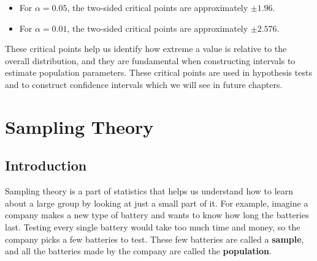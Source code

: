 \documentclass[twoside]{book}
\begin{document}
\begin{center}
\end{center}

\begin{itemize}
	\item For \(\alpha = 0.05\), the two-sided critical points are approximately \(\pm 1.96\).
	\item For \(\alpha = 0.01\), the two-sided critical points are approximately \(\pm 2.576\).
\end{itemize}

These critical points help us identify how extreme a value is relative to the overall distribution, and they are fundamental when constructing intervals to estimate population parameters. These critical points are used in hypothesis tests and to construct confidence intervals which we will see in future chapters.

\chapter{Sampling Theory}
\section{Introduction}
Sampling theory is a part of statistics that helps us understand how to learn about a large group by looking at just a small part of it. For example, imagine a company makes a new type of battery and wants to know how long the batteries last. Testing every single battery would take too much time and money, so the company picks a few batteries to test. These few batteries are called a \textbf{sample}, and all the batteries made by the company are called the \textbf{population}.
\end{document}
